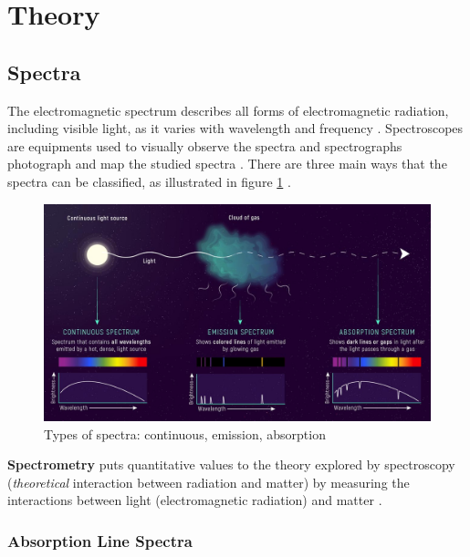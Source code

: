 \documentclass[12pt]{article}
\begin{document}

\vspace{4cm}

\section{Theory} \label{sec:1}

\subsection{Spectra}

The electromagnetic spectrum describes all forms of electromagnetic radiation, including visible light, as it varies with wavelength
and frequency  
\cite{britspectra,hubblespectra}.
Spectroscopes are equipments used to visually observe the spectra and spectrographs photograph and map the studied spectra
\cite{britspectra}.
There are three main ways that the spectra can be classified, as illustrated in figure \ref{fig:spectra} \cite{spectrapic}.

\begin{figure}[H]
    \centering
    \includegraphics[width=15cm]{spectra.jpg}
    \caption{\centering \footnotesize{Types of spectra: continuous, emission, absorption \protect\cite{spectrapic}}}
    \label{fig:spectra}
\end{figure}

\textbf{Spectrometry} puts quantitative values to the theory explored by spectroscopy (\textit{theoretical} interaction between radiation and matter) by measuring the interactions between light (electromagnetic radiation)
and matter
\cite{ataspectrosco}.

\subsubsection{Absorption Line Spectra}
\end{document}

